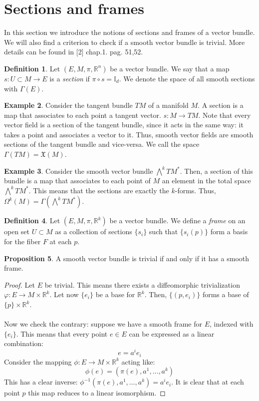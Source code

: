 \documentclass[12pt,a4paper]{report}
\theoremstyle{definition}
\newtheorem{Def}{Definition}[chapter]
\theoremstyle{Theorem}
\newtheorem{Prop}[Def]{Proposition}
\theoremstyle{definition}
\newtheorem{Ex}[Def]{Example}
\theoremstyle{definition}
\begin{document}
	\section{Sections and frames}
	In this section we introduce the notions of sections and frames of a vector bundle. We will also find a criterion to check if a smooth vector bundle is trivial. More details can be found in [2] chap.1. pag. 51,52.
	\begin{Def}\label{Def_5.5}
		Let $(E,M,\pi,\mathbb{R}^n)$ be a vector bundle. We say that a map \\$s:U\subset M\rightarrow E$ is a \textit{section} if $\pi\circ s=\mathbb{I}_d$. We denote the space of all smooth sections with $\Gamma(E)$.
	\end{Def}
	\begin{Ex}
		Consider the tangent bundle $TM$ of a manifold $M$. A section is a map that associates to each point a tangent vector. $s:M\rightarrow TM$. Note that every vector field is a section of the tangent bundle, since it acts in the same way: it takes a point and associates a vector to it. Thus, smooth vector fields are smooth sections of the tangent bundle and vice-versa. We call the space $\Gamma(TM)=\mathfrak{X}(M)$.
	\end{Ex}
	\begin{Ex}
		Consider the smooth vector bundle $\bigwedge^kTM^*$. Then, a section of this bundle is a map that associates to each point of $M$ an element in the total space $\bigwedge^kTM^*$. This means that the sections are exactly the $k$-forms. Thus, $\Omega^k(M)=\Gamma(\bigwedge^kTM^*)$.
	\end{Ex}
	\begin{Def}\label{Def_5.6}
		Let $(E,M,\pi,\mathbb{R}^k)$ be a vector bundle. We define a \textit{frame} on an open set $U\subset M$ as a collection of sections $\{s_i\}$ such that $\{s_i(p)\}$ form a basis for the fiber $F$ at each $p$. 
	\end{Def}
	\begin{Prop}\label{prop_2.3.1}
		A smooth vector bundle is trivial if and only if it has a smooth frame.
	\end{Prop}
	\begin{proof}
		Let $E$ be trivial. This means there exists a diffeomorphic trivialization $\varphi:E\rightarrow M\times \mathbb{R}^k$. Let now $\{e_i\}$ be a base for $\mathbb{R}^k$. Then, $\{(p,e_i)\}$ forms a base of $\{p\}\times \mathbb{R}^k$.
		\\\\
		Now we check the contrary: suppose we have a smooth frame for $E$, indexed with $\{e_i\}$. This means that every point $e\in E$ can be expressed as a linear combination:
		$$e=a^ie_i$$
		Consider the mapping $\phi:E\rightarrow M\times\mathbb{R}^k$ acting like:
		$$\phi(e)=(\pi(e),a^1,...,a^k)$$
		This has a clear inverse: $\phi^{-1}(\pi(e),a^1,...,a^k)=a^ie_i$.
		It is clear that at each point $p$ this map reduces to a linear isomorphism.
	\end{proof}
\end{document}
